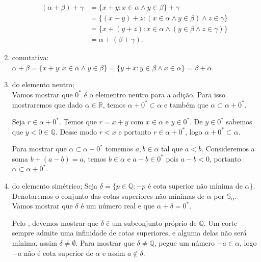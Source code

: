 \documentclass[../main.tex]{subfiles}
\begin{document}
\begin{dem}
\begin{enumerate}[label=(\roman*)]
            \begin{align*}
                (\alpha+\beta)+\gamma &= \{ x+y: x \in \alpha \land y \in \beta \} + \gamma  \\
                &= \{ (x+y)+z : (x \in \alpha \land y \in \beta) \land z \in \gamma \} \\
                &= \{ x+(y+z) : x \in \alpha \land (y \in \beta \land z \in \gamma) \} \\
                &= \alpha + (\beta + \gamma).
            \end{align*}
            
        \item comutativa: \\
            $\alpha + \beta = \{ x+y : x \in \alpha \land y \in \beta \} = \{ y+x: y \in \beta \land x \in \alpha \} = \beta + \alpha$.
            
        \item do elemento neutro; \\
            Vamos mostrar que $0^*$ é o elementro neutro para a adição. Para isso mostraremos que dado $\alpha \in \mathbb{R}$, temos $\alpha + 0^* \subset \alpha$ e também que $\alpha \subset \alpha + 0^*$.

            Seja $r \in \alpha + 0^*$. Temos que $r = x+y$ com $x \in \alpha$ e $y \in 0^*$. De $y \in 0^*$ sabemos que $y < 0 \in \mathbb{Q}$. Desse modo $r < x$ e portanto $r \in \alpha + 0^*$, logo $\alpha + 0^* \subset \alpha$.

            Para mostrar que $\alpha \subset \alpha + 0^*$ tomemos $a, b \in \alpha$ tal que $a < b$. Consideremos a soma $b + (a - b) = a$, temos $b \in \alpha$ e $a-b \in 0^*$ pois $a-b < 0$, portanto $\alpha \subset \alpha + 0^*$.
        \item do elemento simétrico;
            Seja $\delta = \{ p \in \mathbb{Q} : -p \text{ é cota superior não mínima de } \alpha \}$. Denotaremos o conjunto das cotas superiores não mínimas de $\alpha$ por $\mathbb{S}_{\alpha}$.
            Vamos mostrar que $\delta$ é um número real e que $\alpha + \delta = 0^*$.

            Pelo , devemos mostrar que $\delta$ é um subconjunto próprio de $\mathbb{Q}$. Um corte sempre admite uma infinidade de cotas superiores, e alguma delas não será mínima, assim $\delta \neq \emptyset$. Para mostrar que $\delta \neq \mathbb{Q}$, pegue um número $-a \in \alpha$, logo $-a$ não é cota superior de $\alpha$ e assim $a \not\in \delta$.


\end{enumerate}
\end{dem}
\end{document}
